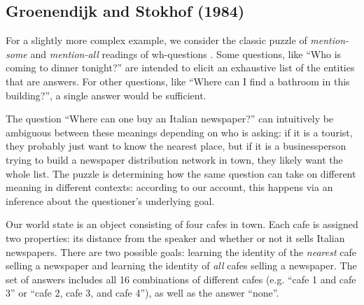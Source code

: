 \documentclass[12pt, floatsintext, jou]{apa6}
\begin{document}
\subsection{Groenendijk and Stokhof (1984)}

For a slightly more complex example, we consider the classic puzzle of \emph{mention-some} and \emph{mention-all} readings of wh-questions  \cite{GroenendijkStokhof84_SemanticsOfQuestions,SchulzVanRooij06_ExhaustiveInterpretation}. Some questions, like ``Who is coming to dinner tonight?'' are intended to elicit an exhaustive list of the entities that are answers. For other questions, like ``Where can I find a bathroom in this building?'', a single answer would be sufficient. 

The question ``Where can one buy an Italian newspaper?'' can intuitively be ambiguous between these meanings depending on who is asking: if it is a tourist, they probably just want to know the nearest place, but if it is a businessperson trying to build a newspaper distribution network in town, they likely want the whole list. The puzzle is determining how the same question can take on different meaning in different contexts: according to our account, this happens via an inference about the questioner's underlying goal.

Our world state is an object consisting of four cafes in town. Each cafe is assigned two properties: its distance from the speaker and whether or not it sells Italian newspapers. There are two possible goals: learning the identity of the \emph{nearest} cafe selling a newspaper and learning the identity of \emph{all} cafes selling a newspaper. The set of answers includes all 16 combinations of different cafes (e.g. ``cafe 1 and cafe 3'' or ``cafe 2, cafe 3, and cafe 4''), as well as the answer ``none''. 
\end{document}
